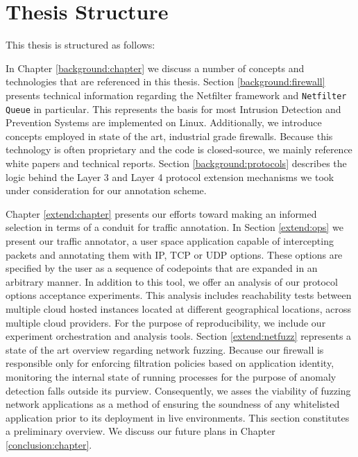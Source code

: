\section{Thesis Structure}
\label{intro:structure}

This thesis is structured as follows:

In Chapter \ref{background:chapter} we discuss a number of concepts and
technologies that are referenced in this thesis. Section \ref{background:firewall}
presents technical information regarding the Netfilter framework and
\texttt{Netfilter Queue} in particular. This represents the basis for most
Intrusion Detection and Prevention Systems are implemented on Linux. Additionally,
we introduce concepts employed in state of the art, industrial grade firewalls.
Because this technology is often proprietary and the code is closed-source, we
mainly reference white papers and technical reports. Section \ref{background:protocols}
describes the logic behind the Layer 3 and Layer 4 protocol extension mechanisms
we took under consideration for our annotation scheme.


Chapter \ref{extend:chapter} presents our efforts toward making an informed
selection in terms of a conduit for traffic annotation. In Section \ref{extend:ops}
we present our traffic annotator, a user space application capable of intercepting
packets and annotating them with IP, TCP or UDP options. These options are
specified by the user as a sequence of codepoints that are expanded in an
arbitrary manner. In addition to this tool, we offer an analysis of our protocol
options acceptance experiments. This analysis includes reachability tests between
multiple cloud hosted instances located at different geographical locations,
across multiple cloud providers. For the purpose of reproducibility, we include
our experiment orchestration and analysis tools. Section \ref{extend:netfuzz}
represents a state of the art overview regarding network fuzzing. Because our
firewall is responsible only for enforcing filtration policies based on application
identity, monitoring the internal state of running processes for the purpose of
anomaly detection falls outside its purview. Consequently, we asses the viability
of fuzzing network applications as a method of ensuring the soundness of any
whitelisted application prior to its deployment in live environments. This
section constitutes a preliminary overview. We discuss our future plans in
Chapter \ref{conclusion:chapter}.

